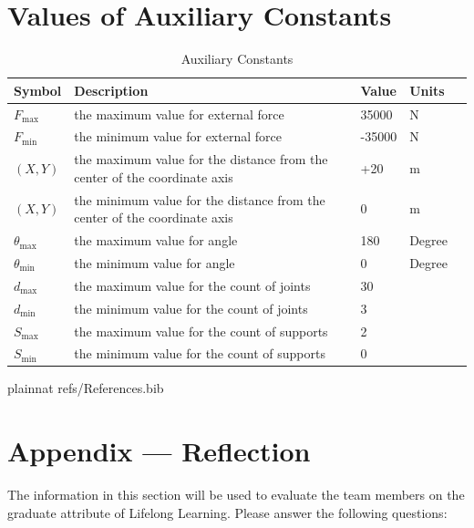 \documentclass[12pt]{article}
\begin{document}
\section{Values of Auxiliary Constants}
\begin{table}[h!]
	\renewcommand{\arraystretch}{1.2}
	\noindent \begin{longtable*}{l l l l c} 
		\toprule
		\textbf{Symbol} & \textbf{Description} & \textbf{Value} & 
		\textbf{Units} \\
		\midrule 
		$F_{\text{max}}$ & the maximum value for external force & 35000 & 
		\si{\newton}\\
		$F_{\text{min}}$ & the minimum value for external force & -35000 & 
		\si{\newton}\\
        $(X, Y)$ & the maximum value for the distance from the center of the coordinate axis & +20 & 
		\si{\metre}\\
        $(X, Y)$ & the minimum value for the distance from the center of the coordinate axis & 0 & 
		\si{\metre}\\
  	
		$\theta_{\text{max}}$ & the maximum value for angle & 180 & 
		Degree\\
		$\theta_{\text{min}}$ & the minimum value for angle & 0 & 
		Degree\\
  $d_{\text{max}}$ & the maximum value for the count of joints & 30 & 
		\\
		$d_{\text{min}}$ & the minimum value for the count of joints &  3 & \\
  $S_{\text{max}}$ & the maximum value for the count of supports & 2 & 
		\\
		$S_{\text{min}}$ & the minimum value for the count of supports &  0 & 
		\\
		\bottomrule		
	\end{longtable*}
	\caption{Auxiliary Constants} \label{TblAuxConst}
\end{table}



\newpage

 {plainnat}
 {refs/References.bib}


\newpage{}
\section*{Appendix --- Reflection}

The information in this section will be used to evaluate the team members on the
graduate attribute of Lifelong Learning.  Please answer the following questions:
\end{document}
